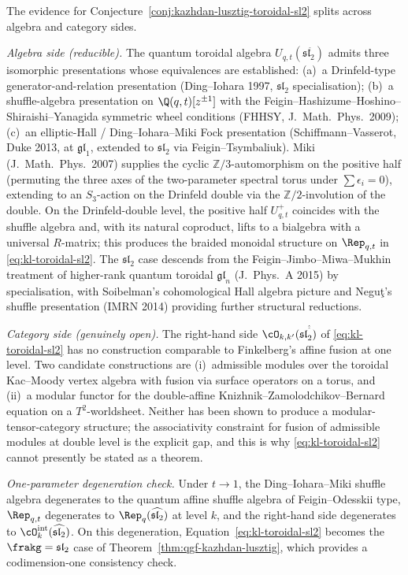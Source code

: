 \begin{remark}
\label{rem:kl-toroidal-sl2-evidence}
The evidence for Conjecture~\ref{conj:kazhdan-lusztig-toroidal-sl2} splits across algebra and category sides.

\emph{Algebra side (reducible).} The quantum toroidal algebra $U_{q,t}(\mathfrak{sl}_2^{\hat{\hat{\ }}})$ admits three isomorphic presentations whose equivalences are established: (a)~a Drinfeld-type generator-and-relation presentation (Ding--Iohara 1997, $\mathfrak{sl}_2$ specialisation); (b)~a shuffle-algebra presentation on $\Q(q, t)[z^{\pm 1}]$ with the Feigin--Hashizume--Hoshino--Shiraishi--Yanagida symmetric wheel conditions (FHHSY, J.\ Math.\ Phys.\ 2009); (c)~an elliptic-Hall / Ding--Iohara--Miki Fock presentation (Schiffmann--Vasserot, Duke 2013, at $\mathfrak{gl}_1$, extended to $\mathfrak{sl}_2$ via Feigin--Tsymbaliuk). Miki (J.\ Math.\ Phys.\ 2007) supplies the cyclic $\mathbb{Z}/3$-automorphism on the positive half (permuting the three axes of the two-parameter spectral torus under $\sum\epsilon_i = 0$), extending to an $S_3$-action on the Drinfeld double via the $\mathbb{Z}/2$-involution of the double. On the Drinfeld-double level, the positive half $U^+_{q,t}$ coincides with the shuffle algebra and, with its natural coproduct, lifts to a bialgebra with a universal $R$-matrix; this produces the braided monoidal structure on $\Rep_{q,t}$ in \eqref{eq:kl-toroidal-sl2}. The $\mathfrak{sl}_2$ case descends from the Feigin--Jimbo--Miwa--Mukhin treatment of higher-rank quantum toroidal $\mathfrak{gl}_n$ (J.\ Phys.\ A 2015) by specialisation, with Soibelman's cohomological Hall algebra picture and Negu\c{t}'s shuffle presentation (IMRN 2014) providing further structural reductions.

\emph{Category side (genuinely open).} The right-hand side $\cO_{k,k'}(\mathfrak{sl}_2^{\hat{\hat{\ }}})$ of \eqref{eq:kl-toroidal-sl2} has no construction comparable to Finkelberg's affine fusion at one level. Two candidate constructions are (i)~admissible modules over the toroidal Kac--Moody vertex algebra with fusion via surface operators on a torus, and (ii)~a modular functor for the double-affine Knizhnik--Zamolodchikov--Bernard equation on a $T^2$-worldsheet. Neither has been shown to produce a modular-tensor-category structure; the associativity constraint for fusion of admissible modules at double level is the explicit gap, and this is why \eqref{eq:kl-toroidal-sl2} cannot presently be stated as a theorem.

\emph{One-parameter degeneration check.} Under $t \to 1$, the Ding--Iohara--Miki shuffle algebra degenerates to the quantum affine shuffle algebra of Feigin--Odesskii type, $\Rep_{q,t}$ degenerates to $\Rep_q(\widehat{\mathfrak{sl}_2})$ at level $k$, and the right-hand side degenerates to $\cO_k^{\mathrm{int}}(\widehat{\mathfrak{sl}_2})$. On this degeneration, Equation~\eqref{eq:kl-toroidal-sl2} becomes the $\frakg = \mathfrak{sl}_2$ case of Theorem~\ref{thm:qgf-kazhdan-lusztig}, which provides a codimension-one consistency check.
\end{remark}

